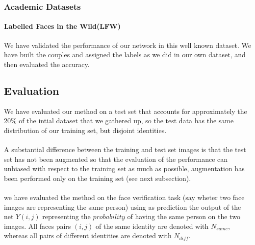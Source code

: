 
\subsubsection{Academic Datasets}
\paragraph{Labelled Faces in the Wild(LFW)} We have validated the performance of our network in this well known dataset. We have built the couples and assigned the labels as we did in our own dataset, and then evaluated the accuracy.


\subsection{Evaluation}
We have evaluated our method on a test set that accounts for approximately the 20\% of the intial dataset that we gathered up, so the test data has the same distribution of our training set, but disjoint identities.

\paragraph{}
A substantial difference between the training and test set images is that the test set has not been augmented so that the evaluation of the performance can unbiased with respect to the training set as much as possible, augmentation has been performed only on the training set (see next subsection).
\paragraph{}
we have evaluated the method on the face verification task (say wheter two face images are representing the same person) using as prediction the output of the net $Y(i,j)$ representing the $probability$ of having the same person on the two images. All faces pairs $(i,j)$ of the same identity are denoted with $N_{same}$, whereas all pairs of different identities are denoted with $N_{diff}$.\\
 
